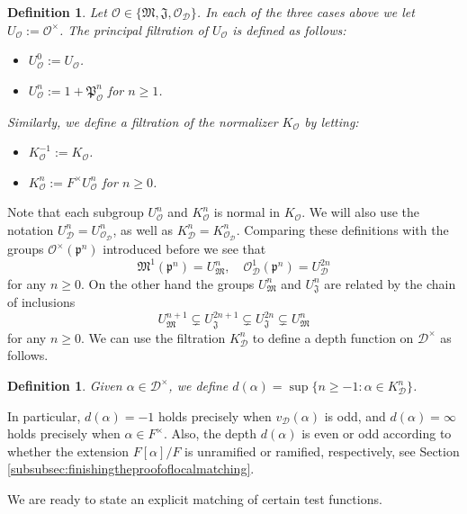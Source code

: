 \documentclass{article}
\newtheorem{defi}[lem]{Definition}
\theoremstyle{named}
\newcommand{\D}{\mathcal{D}}
\newcommand{\M}{\mathfrak{M}}
\newcommand{\J}{\mathfrak{J}}
\renewcommand{\O}{\mathcal{O}}
\renewcommand{\P}{\mathfrak{P}}
\newcommand{\p}{\mathfrak{p}}
\begin{document}
\begin{defi}\label{defi:principalneighbourhoods}
Let $\O \in \{\M, \J, \O_\D\}$. In each of the three cases above we let $U_\O := \O^\times$. The principal filtration of $U_\O$ is defined as follows:
\begin{itemize}
    \item $U_\O^0 := U_\O$.
    \item $U_\O^n := 1 + \P_\O^n$ for $n \geq 1$.
\end{itemize}
Similarly, we define a filtration of the normalizer $K_\O$ by letting:
\begin{itemize}
    \item $K_\O^{-1} := K_\O$.
    \item $K_\O^n := F^\times U_\O^n$ for $n \geq 0$. 
\end{itemize}
\end{defi}
Note that each subgroup $U_\O^n$ and $K_\O^n$ is normal in $K_\O$. We will also use the notation $U_\D^n = U^n_{\O_\D}$, as well as $K_\D^n = K_{\O_\D}^n$. Comparing these definitions with the groups $\O^\times(\p^n)$ introduced before we see that
\begin{equation}\label{eq:comparisonprincipalcongruencesubgroups}
    \M^1(\p^n) = U^n_\M, \quad \O_\D^1(\p^n) = U^{2n}_\D
\end{equation}
for any $n \geq 0$. On the other hand the groups $U^n_\M$ and $U^n_\J$ are related by the chain of inclusions
\begin{equation}\label{eq:chaininclusionshereditarymaximal}
    U_\M^{n + 1} \subsetneq U_\J^{2n + 1} \subsetneq U_\J^{2n} \subsetneq U_\M^{n}
\end{equation}
for any $n \geq 0$. We can use the filtration $K_\D^n$ to define a depth function on $\D^\times$ as follows.
\begin{defi}\label{defi:filtrationunitsdivision}
Given $\alpha \in \D^\times$, we define $d(\alpha) = \sup\{n \geq -1 : \alpha \in K_\D^{n}\}$.
\end{defi}
In particular, $d(\alpha) = -1$ holds precisely when $v_\D(\alpha)$ is odd, and $d(\alpha) = \infty$ holds precisely when $\alpha \in F^\times$. Also, the depth $d(\alpha)$ is even or odd according to whether the extension $F[\alpha]/F$ is unramified or ramified, respectively, see Section \ref{subsubsec:finishingtheproofoflocalmatching}. 

We are ready to state an explicit matching of certain test functions.
\end{document}
